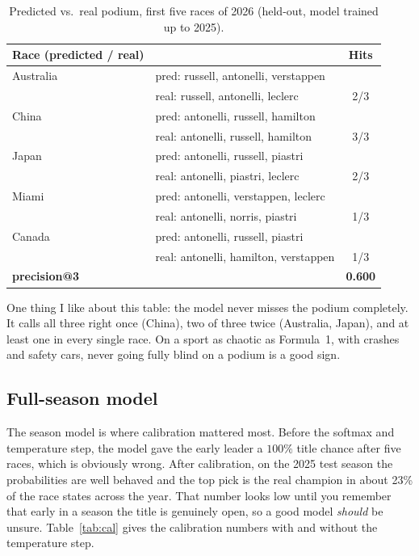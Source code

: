 \documentclass[10pt,twocolumn]{article}
\begin{document}
\begin{table}[t]
\centering
\caption{Predicted vs.\ real podium, first five races of 2026 (held-out, model
trained up to 2025).}
\label{tab:2026}
\footnotesize
\begin{tabular}{@{}llc@{}}
\toprule
Race (predicted / real) & & Hits \\
\midrule
Australia & pred: russell, antonelli, verstappen & \\
          & real: russell, antonelli, leclerc    & 2/3 \\
China     & pred: antonelli, russell, hamilton   & \\
          & real: antonelli, russell, hamilton   & 3/3 \\
Japan     & pred: antonelli, russell, piastri    & \\
          & real: antonelli, piastri, leclerc    & 2/3 \\
Miami     & pred: antonelli, verstappen, leclerc & \\
          & real: antonelli, norris, piastri     & 1/3 \\
Canada    & pred: antonelli, russell, piastri    & \\
          & real: antonelli, hamilton, verstappen& 1/3 \\
\midrule
\multicolumn{2}{l}{\textbf{precision@3}} & \textbf{0.600} \\
\bottomrule
\end{tabular}
\end{table}

One thing I like about this table: the model never misses the podium completely.
It calls all three right once (China), two of three twice (Australia, Japan),
and at least one in every single race. On a sport as chaotic as Formula~1, with
crashes and safety cars, never going fully blind on a podium is a good sign.

\subsection{Full-season model}
The season model is where calibration mattered most. Before the softmax and
temperature step, the model gave the early leader a \(100\%\) title chance after
five races, which is obviously wrong. After calibration, on the 2025 test season
the probabilities are well behaved and the top pick is the real champion in about
23\% of the race states across the year. That number looks low until you remember
that early in a season the title is genuinely open, so a good model \emph{should}
be unsure. Table~\ref{tab:cal} gives the calibration numbers with and without the
temperature step.
\end{document}
